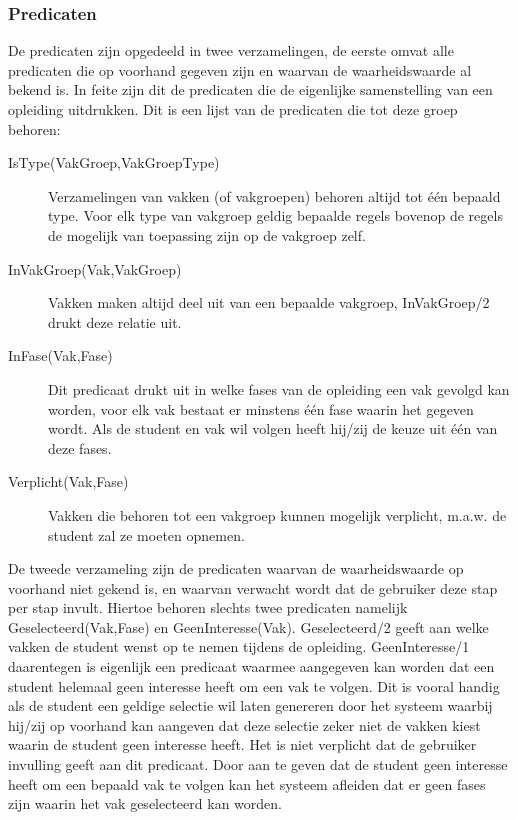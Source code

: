 \subsubsection{Predicaten}
De predicaten zijn opgedeeld in twee verzamelingen, de eerste omvat alle predicaten die op voorhand gegeven zijn en waarvan de waarheidswaarde al bekend is. In feite zijn dit de predicaten die de eigenlijke samenstelling van een opleiding uitdrukken. Dit is een lijst van de predicaten die tot deze groep behoren:
\begin{description}
\item [IsType(VakGroep,VakGroepType)] Verzamelingen van vakken (of vakgroepen) behoren altijd tot \'{e}\'{e}n bepaald type. Voor elk type van vakgroep geldig bepaalde regels bovenop de regels de mogelijk van toepassing zijn op de vakgroep zelf. 
\item [InVakGroep(Vak,VakGroep)] Vakken maken altijd deel uit van een bepaalde vakgroep, InVakGroep/2 drukt deze relatie uit. 
\item [InFase(Vak,Fase)] Dit predicaat drukt uit in welke fases van de opleiding een vak gevolgd kan worden, voor elk vak bestaat er minstens \'{e}\'{e}n fase waarin het gegeven wordt. Als de student en vak wil volgen heeft hij/zij de keuze uit \'{e}\'{e}n van deze fases.
\item [Verplicht(Vak,Fase)] Vakken die behoren tot een vakgroep kunnen mogelijk verplicht, m.a.w. de student zal ze moeten opnemen.
\end{description}

De tweede verzameling zijn de predicaten waarvan de waarheidswaarde op voorhand niet gekend is, en waarvan verwacht wordt dat de gebruiker deze stap per stap invult. 
Hiertoe behoren slechts twee predicaten namelijk Geselecteerd(Vak,Fase) en GeenInteresse(Vak). Geselecteerd/2 geeft aan welke vakken de student wenst op te nemen tijdens de opleiding. GeenInteresse/1 daarentegen is eigenlijk een predicaat waarmee aangegeven kan worden dat een student helemaal geen interesse heeft om een vak te volgen. Dit is vooral handig als de student een geldige selectie wil laten genereren door het systeem waarbij hij/zij op voorhand kan aangeven dat deze selectie zeker niet de vakken kiest waarin de student geen interesse heeft. Het is niet verplicht dat de gebruiker invulling geeft aan dit predicaat. Door aan te geven dat de student geen interesse heeft om een bepaald vak te volgen kan het systeem afleiden dat er geen fases zijn waarin het vak geselecteerd kan worden.

